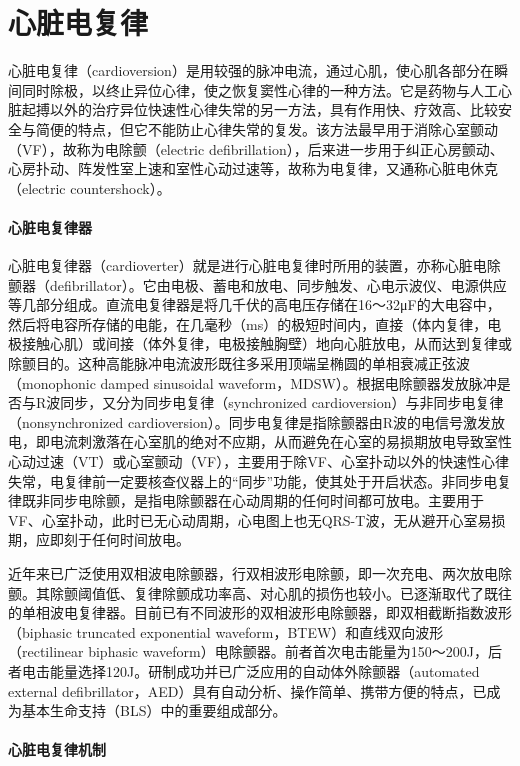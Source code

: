 \chapter{心脏电复律}

心脏电复律（cardioversion）是用较强的脉冲电流，通过心肌，使心肌各部分在瞬间同时除极，以终止异位心律，使之恢复窦性心律的一种方法。它是药物与人工心脏起搏以外的治疗异位快速性心律失常的另一方法，具有作用快、疗效高、比较安全与简便的特点，但它不能防止心律失常的复发。该方法最早用于消除心室颤动（VF），故称为电除颤（electric
defibrillation），后来进一步用于纠正心房颤动、心房扑动、阵发性室上速和室性心动过速等，故称为电复律，又通称心脏电休克（electric
countershock）。

\subsubsection{心脏电复律器}

心脏电复律器（cardioverter）就是进行心脏电复律时所用的装置，亦称心脏电除颤器（defibrillator）。它由电极、蓄电和放电、同步触发、心电示波仪、电源供应等几部分组成。直流电复律器是将几千伏的高电压存储在16～32μF的大电容中，然后将电容所存储的电能，在几毫秒（ms）的极短时间内，直接（体内复律，电极接触心肌）或间接（体外复律，电极接触胸壁）地向心脏放电，从而达到复律或除颤目的。这种高能脉冲电流波形既往多采用顶端呈椭圆的单相衰减正弦波（monophonic
damped sinusoidal
waveform，MDSW）。根据电除颤器发放脉冲是否与R波同步，又分为同步电复律（synchronized
cardioversion）与非同步电复律（nonsynchronized
cardioversion）。同步电复律是指除颤器由R波的电信号激发放电，即电流刺激落在心室肌的绝对不应期，从而避免在心室的易损期放电导致室性心动过速（VT）或心室颤动（VF），主要用于除VF、心室扑动以外的快速性心律失常，电复律前一定要核查仪器上的“同步”功能，使其处于开启状态。非同步电复律既非同步电除颤，是指电除颤器在心动周期的任何时间都可放电。主要用于VF、心室扑动，此时已无心动周期，心电图上也无QRS-T波，无从避开心室易损期，应即刻于任何时间放电。

近年来已广泛使用双相波电除颤器，行双相波形电除颤，即一次充电、两次放电除颤。其除颤阈值低、复律除颤成功率高、对心肌的损伤也较小。已逐渐取代了既往的单相波电复律器。目前已有不同波形的双相波形电除颤器，即双相截断指数波形（biphasic
truncated exponential waveform，BTEW）和直线双向波形（rectilinear
biphasic
waveform）电除颤器。前者首次电击能量为150～200J，后者电击能量选择120J。研制成功并已广泛应用的自动体外除颤器（automated
external
defibrillator，AED）具有自动分析、操作简单、携带方便的特点，已成为基本生命支持（BLS）中的重要组成部分。

\subsubsection{心脏电复律机制}

